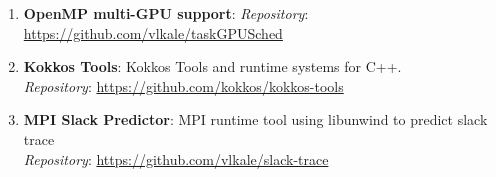 
\begin{enumerate}
\item \textbf{OpenMP multi-GPU support}: \textit{Repository}: \url{https://github.com/vlkale/taskGPUSched}
\item \textbf{Kokkos Tools}: Kokkos Tools and runtime systems for C++.\\ \textit{Repository}: \url{https://github.com/kokkos/kokkos-tools}
\item \textbf{MPI Slack Predictor}: MPI runtime tool using libunwind to predict slack trace \\ \textit{Repository}: \url{https://github.com/vlkale/slack-trace}
\end{enumerate}
